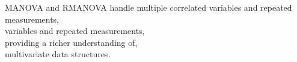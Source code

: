 \documentclass[preview]{standalone}
\begin{document}
\begin{center}
MANOVA and RMANOVA handle multiple correlated variables and repeated measurements,\\variables and repeated measurements,\\providing a richer understanding of,\\multivariate data structures.
\end{center}
\end{document}
